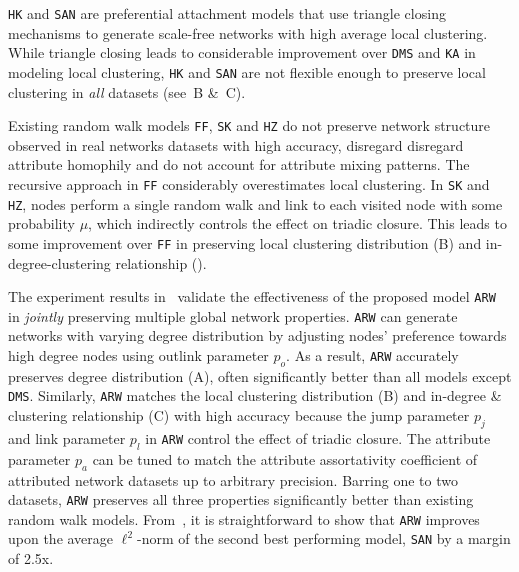 \texttt{HK} and \texttt{SAN} are preferential attachment models
that use triangle closing mechanisms to generate scale-free networks with high average
local clustering.
While triangle closing leads to considerable improvement over \texttt{DMS}
and \texttt{KA} in modeling local clustering, \texttt{HK} and \texttt{SAN} are not flexible enough
to preserve local clustering in \textit{all} datasets (see~B \&~C).

Existing random walk models \texttt{FF}, \texttt{SK} and \texttt{HZ}
do not preserve network structure observed in real networks datasets with high
accuracy, disregard disregard attribute homophily and do not account for attribute mixing patterns.
The recursive approach in \texttt{FF} considerably overestimates local clustering.
In \texttt{SK} and \texttt{HZ}, nodes perform a single random walk and link to
each visited node with some probability $\mu$, which indirectly
controls the effect on triadic closure. This leads to some improvement over \texttt{FF} in preserving local
clustering distribution (B) and in-degree-clustering relationship ().


The experiment results in~ validate the effectiveness
of the proposed model \texttt{ARW} in \textit{jointly} preserving multiple
global network properties. \texttt{ARW} can generate networks with varying
degree distribution by adjusting nodes' preference towards high degree nodes
using outlink parameter $p_o$. As a result, \texttt{ARW} accurately preserves
degree distribution (A), often significantly better
than all models except \texttt{DMS}. Similarly, \texttt{ARW} matches the local clustering
distribution  (B) and in-degree \& clustering relationship
(C) with high accuracy because the jump parameter $p_j$ and
link parameter $p_l$ in \texttt{ARW} control the effect of triadic closure.
The attribute parameter $p_a$ can be tuned to match the attribute assortativity
coefficient of attributed network datasets up to arbitrary precision.
Barring one to two datasets, \texttt{ARW} preserves all three properties significantly
better than existing random walk models.
From~, it is straightforward to show that
\texttt{ARW} improves upon the average $\ell^2$-norm of the second best performing model,
\texttt{SAN} by a margin of 2.5x.


